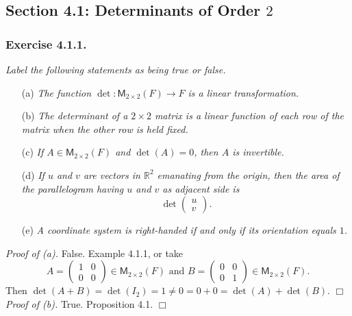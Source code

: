 \documentclass{article}
\begin{document}
\subsection*{Section 4.1: Determinants of Order $2$ \\}



\subsubsection*{Exercise 4.1.1.}
\emph{Label the following statements as being true or false.}
\begin{enumerate}
\item[(a)]
\emph{The function $\det: \mathsf{M}_{2 \times 2}(F) \to F$
is a linear transformation.}
\item[(b)]
\emph{The determinant of a $2 \times 2$ matrix is a linear function of each row
of the matrix when the other row is held fixed.}
\item[(c)]
\emph{If $A \in \mathsf{M}_{2 \times 2}(F)$ and $\det(A) = 0$, then $A$ is invertible.}
\item[(d)]
\emph{If $u$ and $v$ are vectors in $\mathbb{R}^2$ emanating from the origin,
then the area of the parallelogram having $u$ and $v$ as adjacent side is
$$\det\begin{pmatrix} u \\ v \end{pmatrix}.$$}
\item[(e)]
\emph{A coordinate system is right-handed if and only if its orientation equals $1$.} \\
\end{enumerate}

\emph{Proof of (a).}
False. Example 4.1.1, or
take
$$A =
\begin{pmatrix}
1 & 0 \\
0 & 0
\end{pmatrix} \in \mathsf{M}_{2 \times 2}(F) \text{ and }
B =
\begin{pmatrix}
0 & 0 \\
0 & 1
\end{pmatrix} \in \mathsf{M}_{2 \times 2}(F).
$$
Then $\det(A+B) = \det(I_2) = 1 \neq 0 = 0 + 0 = \det(A) + \det(B)$.
$\Box$ \\

\emph{Proof of (b).}
True. Proposition 4.1.
$\Box$ \\
\end{document}
